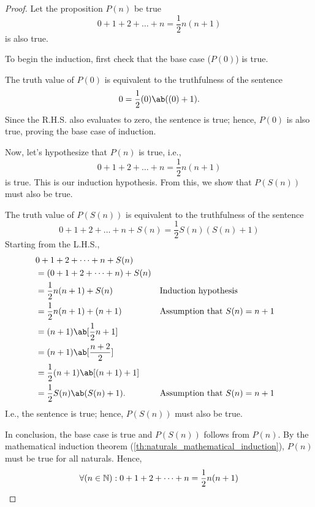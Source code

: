 \begin{proof}
  Let the proposition \(P(n)\) be true \ifft
  \begin{equation}
    0 + 1 + 2 + \dots + n = \frac{1}{2} n (n + 1)
  \end{equation}
  is also true.

  To begin the induction, first check that the base case (\(P(0)\)) is true.

  \basecase The truth value of \(P(0)\) is equivalent to the truthfulness of the sentence
  \begin{equation}
    0 = \frac{1}{2}(0)\ab((0) + 1).
  \end{equation}
  Since the R.H.S. also evaluates to zero, the sentence is true; hence, \(P(0)\) is also true,
  proving the base case of induction.

  \inductivestep Now, let's hypothesize that \(P(n)\) is true, i.e.,
  \begin{equation}
    0 + 1 + 2 + \dots + n = \frac{1}{2} n (n + 1)
  \end{equation}
  is true. This is our induction hypothesis. From this, we show that \(P(S(n))\) must also be true.

  The truth value of \(P(S(n))\) is equivalent to the truthfulness of the sentence
  \begin{equation}
    0 + 1 + 2 + \dots + n + S(n) = \frac{1}{2}S(n) (S(n) + 1)
  \end{equation}
  Starting from the L.H.S.,
  \begin{align*}
    & 0 + 1 + 2 + \dots + n + S(n)                                                        \\
    & = (0 + 1 + 2 + \dots + n) + S(n)                                                    \\
    & = \frac{1}{2}n(n + 1) + S(n)         &  & \textrm{Induction hypothesis}             \\
    & = \frac{1}{2}n(n + 1) + (n + 1)      &  & \textrm{Assumption that \(S(n) = n + 1\)} \\
    & = (n + 1)\ab[\frac{1}{2}n + 1]                                                      \\
    & = (n + 1)\ab[\frac{n + 2}{2}]                                                       \\
    & = \frac{1}{2}(n + 1)\ab[(n + 1) + 1]                                                \\
    & = \frac{1}{2}S(n)\ab(S(n) + 1).      &  & \textrm{Assumption that \(S(n) = n + 1\)}
  \end{align*}
  I.e., the sentence is true; hence, \(P(S(n))\) must also be true.

  In conclusion, the base case is true and \(P(S(n))\) follows from \(P(n)\). By the mathematical
  induction theorem (\cref{th:naturals_mathematical_induction}), \(P(n)\) must be true for all
  naturals. Hence,
  \begin{equation*}
    \forall(n \in \mathbb{N}) : 0 + 1 + 2 + \dots + n = \frac{1}{2}n(n + 1) \qedhere
  \end{equation*}
\end{proof}

